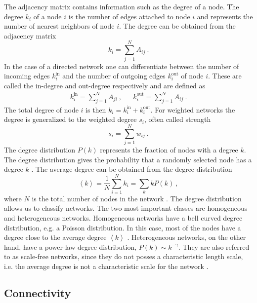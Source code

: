 \documentclass[11 pt , letterpaper , twoside , openright]{book}
\begin{document}
The adjacency matrix contains information such as the degree of a node. The degree $k_i$ of a node $i$ is the number of edges attached to node $i$ and represents the number of nearest neighbors of node $i$. The degree can be obtained from the adjacency matrix \cite{Mata2020}
\begin{equation}
	k_i = \sum_{j=1}^N A_{ij}\ .
\end{equation}
In the case of a directed network one can differentiate between the number of incoming edges $k_i^{\textrm{in}}$ and the number of outgoing edges $k_i^{\textrm{out}}$ of node $i$. These are called the in-degree and out-degree respectively and are defined as \cite{Mata2020}
\begin{align}
	k_i^{\text{in}} = \sum_{j=1}^N A_{ji} \ , && k_i^{\text{out}} = \sum_{j=1}^N A_{ij} \ .
\end{align}
The total degree of node $i$ is then $k_i = k_i^{\text{in}} + k_i^{\text{out}}$. For weighted networks the degree is generalized to the weighted degree $s_i$, often called strength \cite{Ioannis2007}
\begin{equation}
	s_i = \sum_{j=1}^N w_{ij} \ .
\end{equation}
The degree distribution $P(k)$ represents the fraction of nodes with a degree $k$. The degree distribution gives the probability that a randomly selected node has a degree $k$ \cite{Newman2003}. The average degree can be obtained from the degree distribution
\begin{equation}
	\left<k\right> = \frac{1}{N} \sum_{i=1}^N k_i = \sum_k k P(k) \ ,
\end{equation}
where $N$ is the total number of nodes in the network \cite{Mata2020}. The degree distribution allows us to classify networks. The two most important classes are homogeneous and heterogeneous networks. Homogeneous networks have a bell curved degree distribution, e.g. a Poisson distribution. In this case, most of the nodes have a degree close to the average degree $\left<k\right>$ \cite{Barabasi2016}. Heterogeneous networks, on the other hand, have a power-law degree distribution, $P(k) \sim k^{-\gamma}$. They are also referred to as scale-free networks, since they do not posses a characteristic length scale, i.e. the average degree is not a characteristic scale for the network \cite{Barabasi2016}\cite{Mata2020}.

\subsection{Connectivity}\label{connect}
\end{document}
